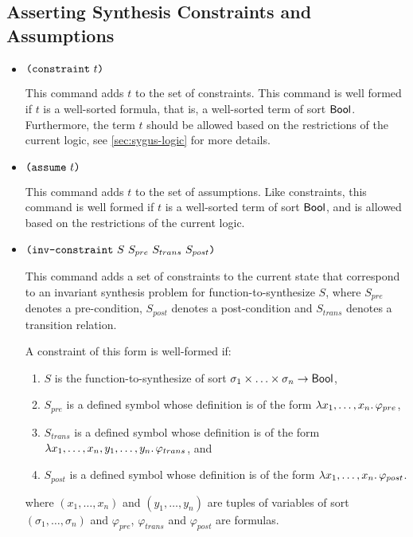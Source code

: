 \documentclass[english,a4paper,10pt]{article}
\begin{document}
\subsection{Asserting Synthesis Constraints and Assumptions}%
\label{ssec:asserting}

\begin{itemize}
\item $\texttt{(}\texttt{constraint}\mbox{ }t\texttt{)}$

This command adds $t$ to the set of constraints.
This command is well formed if $t$ is a well-sorted formula,
that is, a well-sorted term of sort $\mathsf{Bool}$.
Furthermore,
the term $t$ should be allowed
based on the restrictions of the current logic,
see \cref{sec:sygus-logic} for more details.

\item $\texttt{(}\texttt{assume}\mbox{ }t\texttt{)}$

This command adds $t$ to the set of assumptions.
Like constraints,
this command is well formed if $t$ is a well-sorted term of sort $\mathsf{Bool}$,
and is allowed based on the restrictions of the current logic.

\item $\texttt{(}\texttt{inv-constraint}\mbox{ }S\mbox{ }S_{pre}\mbox{ }S_{trans}\mbox{ }S_{post}\texttt{)}$

This command adds a set of constraints to the current 
state that correspond to an invariant synthesis problem for function-to-synthesize $S$,
where $S_{pre}$ denotes a pre-condition,
$S_{post}$ denotes a post-condition
and $S_{trans}$ denotes a transition relation.

A constraint of this form is well-formed if:
\begin{enumerate}
\item
$S$ is the function-to-synthesize
of sort $\sigma_1 \times \ldots \times \sigma_n \rightarrow \mathsf{Bool}$,
\item
$S_{pre}$ is a defined symbol 
whose definition is of the form $\lambda x_1, \ldots, x_n \ldotp \varphi_{pre}$,
\item
$S_{trans}$ is a defined symbol 
whose definition is of the form $\lambda x_1, \ldots, x_n, y_1, \ldots, y_n \ldotp \varphi_{trans}$, and
\item
$S_{post}$ is a defined symbol 
whose definition is of the form $\lambda x_1, \ldots, x_n \ldotp \varphi_{post}$.
\end{enumerate}
where $(x_1, \ldots, x_n)$ and $(y_1, \ldots, y_n)$
are tuples of variables of sort $(\sigma_1, \ldots, \sigma_n)$ and
$\varphi_{pre}$, $\varphi_{trans}$ and $\varphi_{post}$ are formulas.


\end{itemize}
\end{document}
